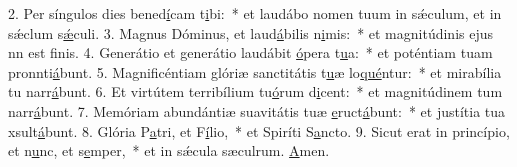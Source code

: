 2. Per síngulos dies bened\uline{í}cam t\uline{i}bi:~* et laudábo nomen tuum in sǽculum, et in sǽclum s\uline{ǽ}culi.
3. Magnus Dóminus, et laud\uline{á}bilis n\uline{i}mis:~* et magnitúdinis ejus nn est f\uline{i}nis.
4. Generátio et generátio laudábit \uline{ó}pera t\uline{u}a:~* et poténtiam tuam pronnti\uline{á}bunt.
5. Magnificéntiam glóriæ sanctitátis t\uline{u}æ lo\uline{qué}ntur:~* et mirabília tu narr\uline{á}bunt.
6. Et virtútem terribílium tu\uline{ó}rum d\uline{i}cent:~* et magnitúdinem tum narr\uline{á}bunt.
7. Memóriam abundántiæ suavitátis tuæ \uline{e}ruct\uline{á}bunt:~* et justítia tua xsult\uline{á}bunt.
8. Glória P\uline{a}tri, et F\uline{í}lio,~* et Spiríti S\uline{a}ncto.
9. Sicut erat in princípio, et n\uline{u}nc, et s\uline{e}mper,~* et in sǽcula sæculrum. \uline{A}men.
